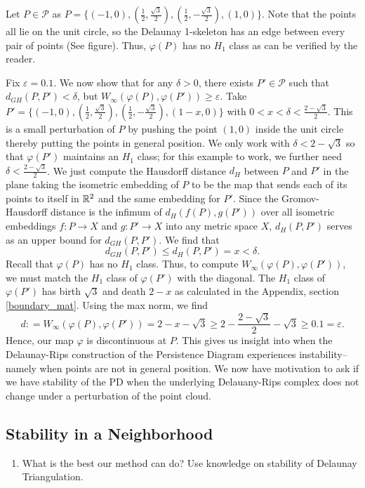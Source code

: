\documentclass[letterpaper,titlepage]{article}
\begin{document}
Let $P \in \mathcal{P}$ as $P = \{(-1,0),(\frac{1}{2},\frac{\sqrt{3}}{2}),(\frac{1}{2},-\frac{\sqrt{3}}{2}),(1,0)\}.$ Note that the points all lie on the unit circle, so the Delaunay 1-skeleton has an edge between every pair of points (See figure). Thus, $\varphi(P)$ has no $H_1$ class as can be verified by the reader.

Fix $\varepsilon=0.1$. We now show that for any $\delta > 0$, there exists $P' \in \mathcal{P}$ such that $d_{GH}(P,P')< \delta$, but $W_\infty(\varphi(P), \varphi(P')) \geq \varepsilon.$ Take $P' = \{(-1,0),(\frac{1}{2},\frac{\sqrt{3}}{2}),(\frac{1}{2},-\frac{\sqrt{3}}{2}),(1-x,0)\}$ with $0<x < \delta < \frac{2-\sqrt{3}}{2}$. This is a small perturbation of $P$ by pushing the point $(1,0)$ inside the unit circle thereby putting the points in general position. We only work with $\delta<2-\sqrt{3}$ so that $\varphi(P')$ maintains an $H_1$ class; for this example to work, we further need $\delta < \frac{2-\sqrt{3}}{2}$. We just compute the Hausdorff distance $d_H$ between $P$ and $P'$ in the plane taking the isometric embedding of $P$ to be the map that sends each of its points to itself in $\mathbb{R}^2$ and the same embedding for $P'$. Since the Gromov-Hausdorff distance is the infimum of $d_H(f(P),g(P'))$ over all isometric embeddings $f:P \to X$ and $g: P' \to X$ into any metric space $X$, $d_H(P,P')$ serves as an upper bound for $d_{GH}(P,P').$ We find that
$$d_{GH}(P,P')\leq d_H(P,P')=x<\delta.$$
Recall that $\varphi(P)$ has no $H_1$ class. Thus, to compute $W_\infty(\varphi(P),\varphi(P'))$, we must match the $H_1$ class of $\varphi(P')$ with the diagonal. The $H_1$ class of $\varphi(P')$ has birth $\sqrt{3}$ and death $2-x$ as calculated in the Appendix, section \ref{boundary_mat}. Using the max norm, we find
$$d: = W_\infty(\varphi(P),\varphi(P')) = 2-x-\sqrt{3} \geq 2-\frac{2-\sqrt{3}}{2} -\sqrt{3} \geq 0.1 = \varepsilon.$$
Hence, our map $\varphi$ is discontinuous at $P$. This gives us insight into when the Delaunay-Rips construction of the Persistence Diagram experiences instability--namely when points are not in general position. We now have motivation to ask if we have stability of the PD when the underlying Delauany-Rips complex does not change under a perturbation of the point cloud.

\subsection{Stability in a Neighborhood}
\begin{enumerate}
    \item What is the best our method can do? Use knowledge on stability of Delaunay Triangulation.
\end{enumerate}
\end{document}
